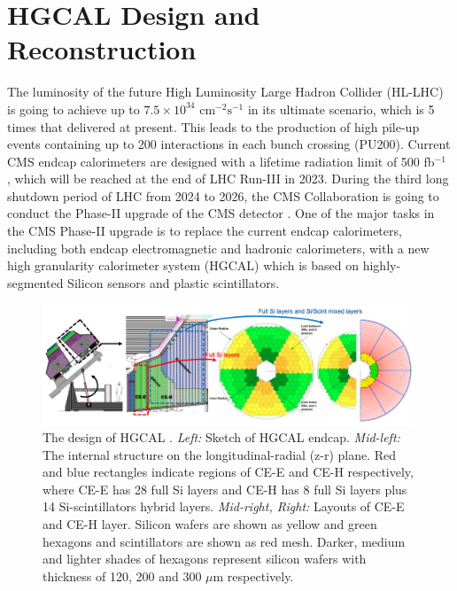
\section{HGCAL Design and Reconstruction}
\label{sec:hgcal:overview}


The luminosity of the future High Luminosity Large Hadron Collider (HL-LHC) is going to achieve up to $7.5\times 10^{34}$ $\text{cm}^{-2}\text{s}^{-1}$ \cite{hllhcweb} in its ultimate scenario, which is 5 times that delivered at present. This leads to the production of high pile-up events containing up to 200 interactions in each bunch crossing (PU200). Current CMS endcap calorimeters \cite{Chatrchyan:2008aa} are designed with a lifetime radiation limit of 500 fb$^{-1}$ \cite{CMSCollaboration:2015zni}, which will be reached at the end of LHC Run-III in 2023. During the third long shutdown period of LHC from 2024 to 2026, the CMS Collaboration is going to conduct the Phase-II upgrade of the CMS detector \cite{CMSCollaboration:2015zni}. One of the major tasks in the CMS Phase-II upgrade is to replace the current endcap calorimeters, including both endcap electromagnetic and hadronic calorimeters, with a new high granularity calorimeter system (HGCAL) which is based on highly-segmented Silicon sensors and plastic scintillators. 

\begin{figure}[ht]
    \centering
    \includegraphics[trim=0cm 0cm 0cm 0cm, clip,width=0.99\textwidth]{chapters/HGCal/figures/chep/hgcal2.png} 
    \caption{ The design of HGCAL \cite{Collaboration:2293646}. \emph{Left:} Sketch of HGCAL endcap. \emph{Mid-left:} The internal structure on the longitudinal-radial (z-r) plane. Red and blue rectangles indicate regions of CE-E and CE-H respectively, where CE-E has 28 full Si layers and CE-H has 8 full Si layers plus 14 Si-scintillators hybrid layers. \emph{Mid-right, Right:} Layouts of CE-E and CE-H layer. Silicon wafers are shown as yellow and green hexagons and scintillators are shown as red mesh. Darker, medium and lighter shades of hexagons represent silicon wafers with thickness of 120, 200 and 300 $\mu$m respectively.
    }
    \label{fig:hgcal}
\end{figure}

